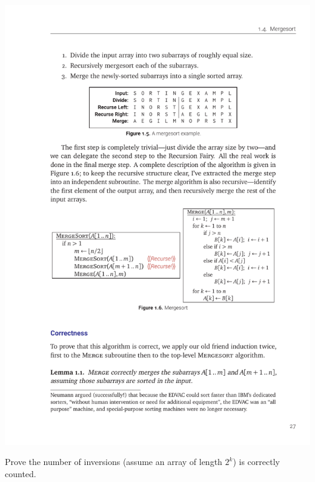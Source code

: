 \documentclass[12pt]{article}
\begin{document}
\includegraphics[scale=1.75]{w04-merge.pdf}

\vspace{.5in}
\noindent Prove the number of inversions (assume an array of length $2^k$) is correctly counted.
\end{document}
